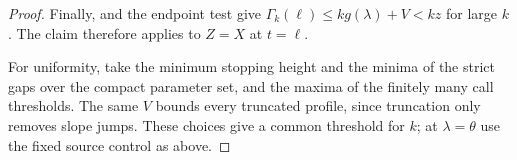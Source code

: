\documentclass[10pt,a4paper]{amsart}
\begin{document}
\begin{proof}
Finally,  and the endpoint test give
$\Gamma_k(\ell)\le kg(\lambda)+V<kz$ for large $k$.
The claim therefore applies to $Z=X$ at $t=\ell$.

For uniformity, take the minimum stopping height and the minima of the strict gaps over the compact parameter set, and the maxima of the finitely many call thresholds.
The same $V$ bounds every truncated profile, since truncation only removes slope jumps.
These choices give a common threshold for $k$; at $\lambda=\theta$ use the fixed source control as above.
\end{proof}
\end{document}
